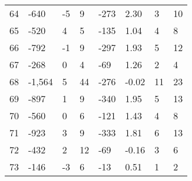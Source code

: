 \begin{appendices}
\begin{longtable}[c]{@{}llllllll@{}}
	64                       & -640                          & -5                           & 9                            & -273                     & 2.30                    & 3                    & 10                      \\
	65                       & -520                          & 4                            & 5                            & -135                     & 1.04                    & 4                    & 8                       \\
	66                       & -792                          & -1                           & 9                            & -297                     & 1.93                    & 5                    & 12                      \\
	67                       & -268                          & 0                            & 4                            & -69                      & 1.26                    & 2                    & 4                       \\
	68                       & -1,564                        & 5                            & 44                           & -276                     & -0.02                   & 11                   & 23                      \\
	69                       & -897                          & 1                            & 9                            & -340                     & 1.95                    & 5                    & 13                      \\
	70                       & -560                          & 0                            & 6                            & -121                     & 1.43                    & 4                    & 8                       \\
	71                       & -923                          & 3                            & 9                            & -333                     & 1.81                    & 6                    & 13                      \\
	72                       & -432                          & 2                            & 12                           & -69                      & -0.16                   & 3                    & 6                       \\
	73                       & -146                          & -3                           & 6                            & -13                      & 0.51                    & 1                    & 2                       \\

\end{longtable}
\end{appendices}

